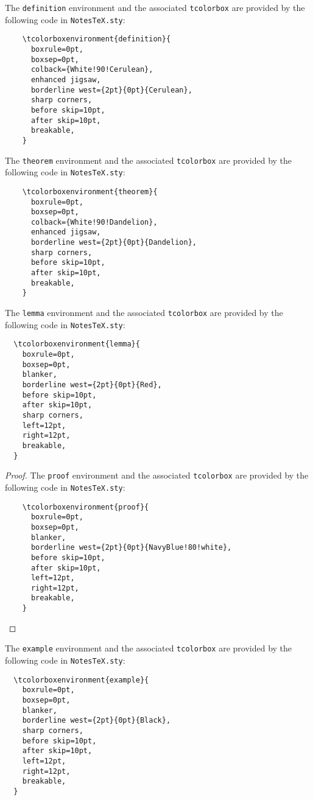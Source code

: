\begin{definition}
  The \texttt{definition} environment and the associated \texttt{tcolorbox} are provided by the following code in \texttt{NotesTeX.sty}:
  \begin{verbatim}
    \tcolorboxenvironment{definition}{
      boxrule=0pt,
      boxsep=0pt,
      colback={White!90!Cerulean},
      enhanced jigsaw, 
      borderline west={2pt}{0pt}{Cerulean},
      sharp corners,
      before skip=10pt,
      after skip=10pt,
      breakable,
    }
  \end{verbatim}
\end{definition}
\begin{theorem}
  The \texttt{theorem} environment and the associated \texttt{tcolorbox} are provided by the following code in \texttt{NotesTeX.sty}:
  \begin{verbatim}
    \tcolorboxenvironment{theorem}{
      boxrule=0pt,
      boxsep=0pt,
      colback={White!90!Dandelion},
      enhanced jigsaw, 
      borderline west={2pt}{0pt}{Dandelion},
      sharp corners,
      before skip=10pt,
      after skip=10pt,
      breakable,
    }
  \end{verbatim}
\end{theorem}
\begin{lemma}
  The \texttt{lemma} environment and the associated \texttt{tcolorbox} are provided by the following code in \texttt{NotesTeX.sty}:
  \begin{verbatim}
  \tcolorboxenvironment{lemma}{
    boxrule=0pt,
    boxsep=0pt,
    blanker,
    borderline west={2pt}{0pt}{Red},
    before skip=10pt,
    after skip=10pt,
    sharp corners,
    left=12pt,
    right=12pt,
    breakable,
  }
  \end{verbatim}
\end{lemma}
\begin{proof}
  The \texttt{proof} environment and the associated \texttt{tcolorbox} are provided by the following code in \texttt{NotesTeX.sty}:
  \begin{verbatim}
    \tcolorboxenvironment{proof}{
      boxrule=0pt,
      boxsep=0pt,
      blanker,
      borderline west={2pt}{0pt}{NavyBlue!80!white},
      before skip=10pt,
      after skip=10pt,
      left=12pt,
      right=12pt,
      breakable,
    }
  \end{verbatim}
\end{proof}
\begin{example}
  The \texttt{example} environment and the associated \texttt{tcolorbox} are provided by the following code in \texttt{NotesTeX.sty}:
  \begin{verbatim}	
  \tcolorboxenvironment{example}{
    boxrule=0pt,
    boxsep=0pt,
    blanker,
    borderline west={2pt}{0pt}{Black},
    sharp corners,
    before skip=10pt,
    after skip=10pt,
    left=12pt,
    right=12pt,
    breakable,
  }
  \end{verbatim}
\end{example}	
